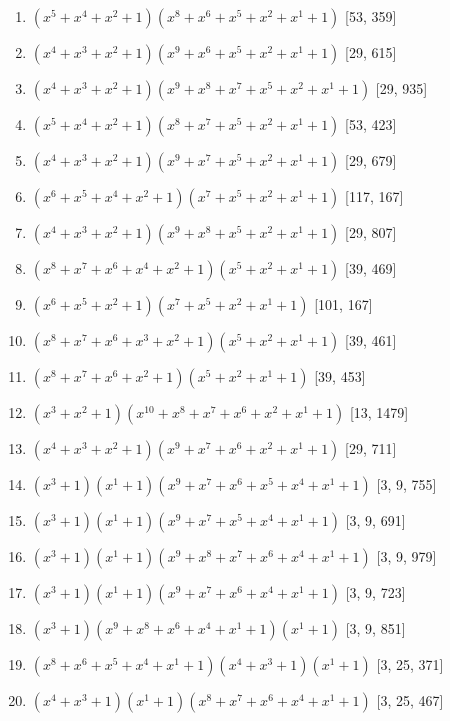 \documentclass[10pt,twocolumn]{article}
\begin{document}
\begin{enumerate}
\item $(x^{5} + x^{4} + x^{2} + 1)(x^{8} + x^{6} + x^{5} + x^{2} + x^{1} + 1)$  [53, 359]
\item $(x^{4} + x^{3} + x^{2} + 1)(x^{9} + x^{6} + x^{5} + x^{2} + x^{1} + 1)$  [29, 615]
\item $(x^{4} + x^{3} + x^{2} + 1)(x^{9} + x^{8} + x^{7} + x^{5} + x^{2} + x^{1} + 1)$  [29, 935]
\item $(x^{5} + x^{4} + x^{2} + 1)(x^{8} + x^{7} + x^{5} + x^{2} + x^{1} + 1)$  [53, 423]
\item $(x^{4} + x^{3} + x^{2} + 1)(x^{9} + x^{7} + x^{5} + x^{2} + x^{1} + 1)$  [29, 679]
\item $(x^{6} + x^{5} + x^{4} + x^{2} + 1)(x^{7} + x^{5} + x^{2} + x^{1} + 1)$  [117, 167]
\item $(x^{4} + x^{3} + x^{2} + 1)(x^{9} + x^{8} + x^{5} + x^{2} + x^{1} + 1)$  [29, 807]
\item $(x^{8} + x^{7} + x^{6} + x^{4} + x^{2} + 1)(x^{5} + x^{2} + x^{1} + 1)$  [39, 469]
\item $(x^{6} + x^{5} + x^{2} + 1)(x^{7} + x^{5} + x^{2} + x^{1} + 1)$  [101, 167]
\item $(x^{8} + x^{7} + x^{6} + x^{3} + x^{2} + 1)(x^{5} + x^{2} + x^{1} + 1)$  [39, 461]
\item $(x^{8} + x^{7} + x^{6} + x^{2} + 1)(x^{5} + x^{2} + x^{1} + 1)$  [39, 453]
\item $(x^{3} + x^{2} + 1)(x^{10} + x^{8} + x^{7} + x^{6} + x^{2} + x^{1} + 1)$  [13, 1479]
\item $(x^{4} + x^{3} + x^{2} + 1)(x^{9} + x^{7} + x^{6} + x^{2} + x^{1} + 1)$  [29, 711]
\item $(x^{3} + 1)(x^{1} + 1)(x^{9} + x^{7} + x^{6} + x^{5} + x^{4} + x^{1} + 1)$  [3, 9, 755]
\item $(x^{3} + 1)(x^{1} + 1)(x^{9} + x^{7} + x^{5} + x^{4} + x^{1} + 1)$  [3, 9, 691]
\item $(x^{3} + 1)(x^{1} + 1)(x^{9} + x^{8} + x^{7} + x^{6} + x^{4} + x^{1} + 1)$  [3, 9, 979]
\item $(x^{3} + 1)(x^{1} + 1)(x^{9} + x^{7} + x^{6} + x^{4} + x^{1} + 1)$  [3, 9, 723]
\item $(x^{3} + 1)(x^{9} + x^{8} + x^{6} + x^{4} + x^{1} + 1)(x^{1} + 1)$  [3, 9, 851]
\item $(x^{8} + x^{6} + x^{5} + x^{4} + x^{1} + 1)(x^{4} + x^{3} + 1)(x^{1} + 1)$  [3, 25, 371]
\item $(x^{4} + x^{3} + 1)(x^{1} + 1)(x^{8} + x^{7} + x^{6} + x^{4} + x^{1} + 1)$  [3, 25, 467]

\end{enumerate}
\end{document}
